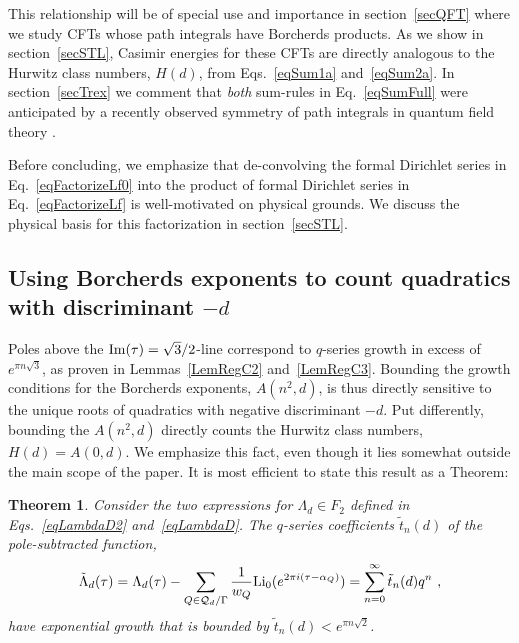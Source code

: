 \documentclass[11pt,a4paper]{article}
\newcommand{\G}{\Gamma}
\newtheorem{thm}{Theorem}[section]
\begin{document}
This relationship will be of special use and importance in section~\ref{secQFT} where we study CFTs whose path integrals have Borcherds products. As we show in section~\ref{secSTL}, Casimir energies for these CFTs are directly analogous to the Hurwitz class numbers, $H(d)$, from Eqs.~\eqref{eqSum1a} and~\eqref{eqSum2a}. In section~\ref{secTrex} we comment that {\em both} sum-rules in Eq.~\eqref{eqSumFull} were anticipated by a recently observed symmetry of path integrals in quantum field theory \cite{06T-rex1, 07T-rex2, 14T-rex0}.

Before concluding, we emphasize that de-convolving the formal Dirichlet series in Eq.~\eqref{eqFactorizeLf0} into the product of formal Dirichlet series in Eq.~\eqref{eqFactorizeLf} is well-motivated on physical grounds. We discuss the physical basis for this factorization in section~\ref{secSTL}.

\subsection{Using Borcherds exponents to count quadratics with discriminant $-d$}\label{svTSM3}

Poles above the ${\rm Im}(\tau) = \sqrt{3}/2$-line correspond to $q$-series growth in excess of $e^{\pi n \sqrt{3}}$, as proven in Lemmas~\ref{LemRegC2} and~\ref{LemRegC3}. Bounding the growth conditions for the Borcherds exponents, $A(n^2,d)$, is thus directly sensitive to the unique roots of quadratics with negative discriminant $-d$. Put differently, bounding the $A(n^2,d)$ directly counts the Hurwitz class numbers, $H(d) = A(0,d)$. We emphasize this fact, even though it lies somewhat outside the main scope of the paper. It is most efficient to state this result as a Theorem:

\begin{thm}\label{HurwitzThm}
Consider the two expressions for $\Lambda_d \in F_2$ defined in Eqs.~\eqref{eqLambdaD2} and~\eqref{eqLambdaD}. The $q$-series coefficients $\tilde{t}_n(d)$ of the pole-subtracted function,
\begin{align}
\tilde{\Lambda}_d(\tau) = \Lambda_d(\tau) - \sum_{Q \in {\cal Q}_d/\G} \frac{1}{w_Q}{\rm Li}_0(e^{2 \pi i (\tau-\alpha_Q)}) = \sum_{n = 0}^{\infty} \tilde{t}_n(d) q^n~, \label{eqThm3}
\end{align}
have exponential growth that is bounded by $\tilde{t}_n(d) < e^{\pi n\sqrt{2}}$. 
\end{thm}
\end{document}
